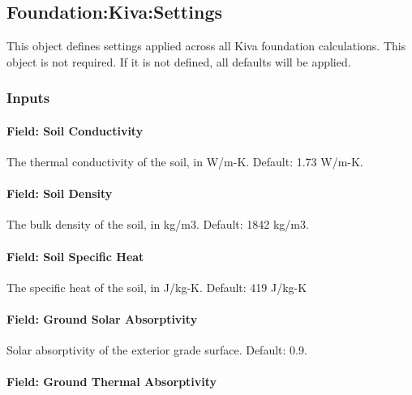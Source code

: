 \subsection{Foundation:Kiva:Settings}\label{foundation-kiva-settings}

This object defines settings applied across all Kiva foundation
calculations. This object is not required. If it is not defined, all
defaults will be applied.

\subsubsection{Inputs}\label{foundation-kiva-settings-inputs}

\paragraph{Field: Soil Conductivity}\label{foundation-kiva-settings-soil-conductivity}

The thermal conductivity of the soil, in W/m-K. Default: 1.73 W/m-K.

\paragraph{Field: Soil Density}\label{foundation-kiva-settings-soil-density}

The bulk density of the soil, in kg/m3. Default: 1842 kg/m3.

\paragraph{Field: Soil Specific Heat}\label{foundation-kiva-settings-soil-specific-heater}

The specific heat of the soil, in J/kg-K. Default: 419 J/kg-K

\paragraph{Field: Ground Solar Absorptivity}\label{foundation-kiva-settings-ground-solar-absorptivity}

Solar absorptivity of the exterior grade surface. Default: 0.9.

\paragraph{Field: Ground Thermal Absorptivity}\label{foundation-kiva-settings-ground-thermal-absorptivity}

